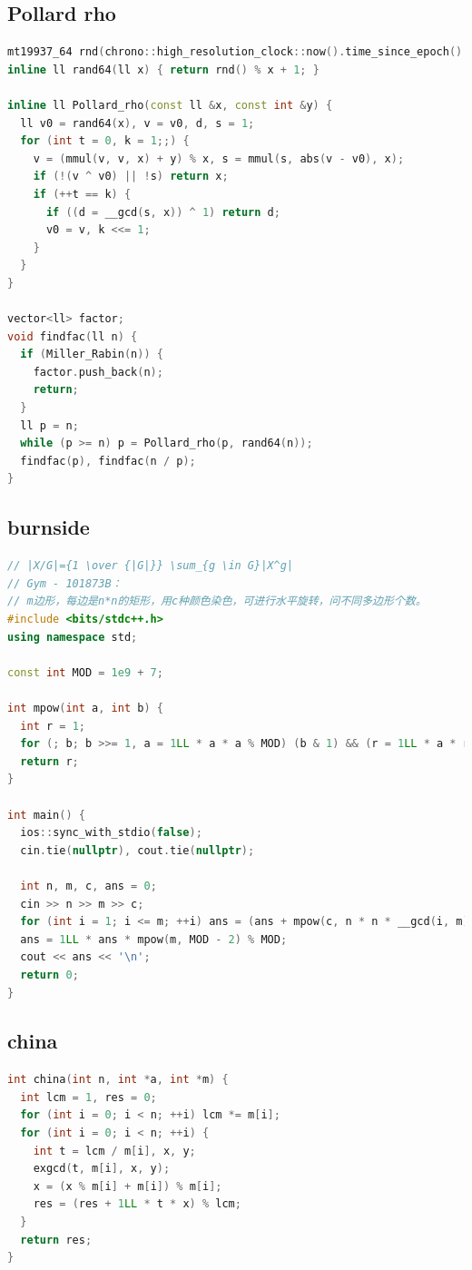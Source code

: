 \documentclass[twoside]{article}
\begin{document}
\subsection{Pollard rho}
\begin{lstlisting}[language=c++]
mt19937_64 rnd(chrono::high_resolution_clock::now().time_since_epoch().count());
inline ll rand64(ll x) { return rnd() % x + 1; }

inline ll Pollard_rho(const ll &x, const int &y) {
  ll v0 = rand64(x), v = v0, d, s = 1;
  for (int t = 0, k = 1;;) {
    v = (mmul(v, v, x) + y) % x, s = mmul(s, abs(v - v0), x);
    if (!(v ^ v0) || !s) return x;
    if (++t == k) {
      if ((d = __gcd(s, x)) ^ 1) return d;
      v0 = v, k <<= 1;
    }
  }
}

vector<ll> factor;
void findfac(ll n) {
  if (Miller_Rabin(n)) {
    factor.push_back(n);
    return;
  }
  ll p = n;
  while (p >= n) p = Pollard_rho(p, rand64(n));
  findfac(p), findfac(n / p);
}

\end{lstlisting}
\subsection{burnside}
\begin{lstlisting}[language=c++]
// |X/G|={1 \over {|G|}} \sum_{g \in G}|X^g|
// Gym - 101873B：
// m边形，每边是n*n的矩形，用c种颜色染色，可进行水平旋转，问不同多边形个数。
#include <bits/stdc++.h>
using namespace std;

const int MOD = 1e9 + 7;

int mpow(int a, int b) {
  int r = 1;
  for (; b; b >>= 1, a = 1LL * a * a % MOD) (b & 1) && (r = 1LL * a * r % MOD);
  return r;
}

int main() {
  ios::sync_with_stdio(false);
  cin.tie(nullptr), cout.tie(nullptr);

  int n, m, c, ans = 0;
  cin >> n >> m >> c;
  for (int i = 1; i <= m; ++i) ans = (ans + mpow(c, n * n * __gcd(i, m))) % MOD;
  ans = 1LL * ans * mpow(m, MOD - 2) % MOD;
  cout << ans << '\n';
  return 0;
}

\end{lstlisting}
\subsection{china}
\begin{lstlisting}[language=c++]
int china(int n, int *a, int *m) {
  int lcm = 1, res = 0;
  for (int i = 0; i < n; ++i) lcm *= m[i];
  for (int i = 0; i < n; ++i) {
    int t = lcm / m[i], x, y;
    exgcd(t, m[i], x, y);
    x = (x % m[i] + m[i]) % m[i];
    res = (res + 1LL * t * x) % lcm;
  }
  return res;
}

\end{lstlisting}
\end{document}
